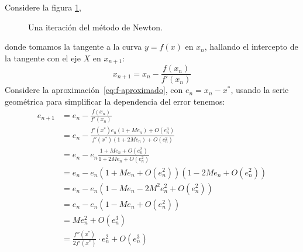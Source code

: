   Considere la figura \ref{02::newton:grafico},
  \begin{figure}[ht]
    \centering
    \caption{Una iteración del método de Newton.}
    \label{02::newton:grafico}
  \end{figure}
  donde tomamos la tangente a la curva \(y = f(x)\) en \(x_n\),
  hallando el intercepto de la tangente con el eje \(X\) en \(x_{n + 1}\):
  \begin{equation}
    x_{n+1}
      = x_n - \frac{f(x_n)}{f'(x_n)}
  \end{equation}
  Considere la aproximación~\eqref{eq:f-aproximado},
  con \(e_n = x_n - x^*\),
  usando la serie geométrica para simplificar la dependencia del error
  tenemos:
  \begin{align*}
    e_{n+1}
      &= e_n - \frac{f(x_n)}{f'(x_n)} \\
      &= e_n - \frac{f'(x^*) e_n (1 + M e_n) + O(e_n^3)}
                    {f'(x^*) (1 + 2 M e_n) + O(e_n^2)} \\
      &= e_n - e_n \frac{1 + M e_n + O(e_n^2)}{1 + 2 M e_n + O(e_n^2)} \\
      &= e_n
          - e_n
              \left( 1 + M e_n + O(e_n^2) \right)
              \left( 1 - 2 M e_n + O(e_n^2) \right) \\
      &= e_n
           - e_n \left(
                   1 - M e_n - 2 M^2 e_n^2 + O(e_n^2)
                 \right) \\
      &= e_n
          - e_n
              \left( 1 - M e_n + O(e_n^2) \right) \\
      &= M e_n^2 + O(e_n^3) \\
      &= \frac{f''(x^*)}{2 f'(x^*)} \cdot e_n^2 + O(e_n^3)
  \end{align*}
